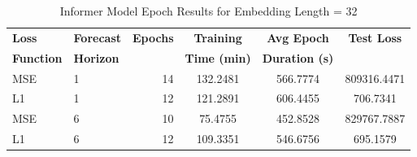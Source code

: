 \documentclass{article}
\begin{document}
\begin{table}
    \footnotesize
    \centering
    \caption{Informer Model Epoch Results for Embedding Length = 32}
    \begin{tabular}{l|l|r|S|S|S}
        \toprule
        \textbf{Loss} & \textbf{Forecast} & \textbf{Epochs} & \textbf{Training} & \textbf{Avg Epoch} & \textbf{Test Loss} \\
        \textbf{Function} & \textbf{Horizon} & & \textbf{Time (min)} & \textbf{Duration (s)} & \\
        \midrule
            MSE & 1 & 14 & 132.2481 & 566.7774 & 809316.4471 \\
        L1 & 1 & 12 & 121.2891 & 606.4455 & 706.7341 \\
        \midrule
        MSE & 6 & 10 & 75.4755 & 452.8528 & 829767.7887 \\
        L1 & 6 & 12 & 109.3351 & 546.6756 & 695.1579 \\
    \bottomrule
    \end{tabular}
    \label{tab:informer_epoch_emb32}
\end{table}
\end{document}
